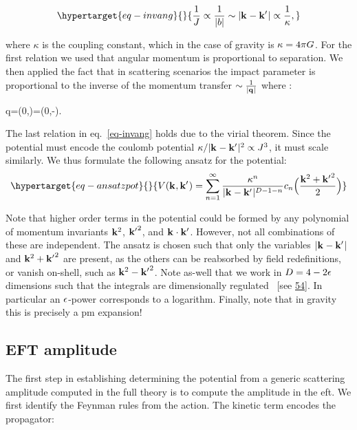 \documentclass[
  11pt,
  a4paper,
  DIV=11,
  numbers=noendperiod,
  twoside]{scrreprt}
\let\[\relax \let\]\relax %
\DeclareRobustCommand{\[}{\begin{equation}}
\DeclareRobustCommand{\]}{\end{equation}}
\begin{document}
\begin{equation}\protect\hypertarget{eq-invang}{}{
  \inv{J} \propto \inv{\abs{\impactParameter}} \sim \abs{\tv{k}-\tv{k'}}\propto \inv{\kappa},
}\label{eq-invang}\end{equation}

where \(\kappa\) is the coupling constant, which in the case of gravity
is \(\kappa=4\pi G\). For the first relation we used that angular
momentum is proportional to separation. We then applied the fact that in
scattering scenarios the impact parameter is proportional to the inverse
of the momentum transfer \(\sim\frac{1}{\vert\mathbf{{q}}_{} \vert}\) where :

\[
q=(0,)=(0,-).
\]

The last relation in eq.~\ref{eq-invang} holds due to the virial
theorem. Since the potential must encode the coulomb potential
\(\kappa/\vert\mathbf{{k}}_{}-\mathbf{{k'}}_{} \vert^2\propto J^3\), it must scale similarly.
We thus formulate the following ansatz for the potential:
\begin{equation}\protect\hypertarget{eq-ansatzpot}{}{
\pot(\tv{k},\tv{k'})=\sum_{n=1}^\infty \frac{\kappa^n}{\abs{\tv{k}-\tv{k'}}^{\Dim-1-n}} c_n\pa[\Big]{\frac{\tv{k}^2+\tv{k'}^2}{2}}
}\label{eq-ansatzpot}\end{equation}

Note that higher order terms in the potential could be formed by any
polynomial of momentum invariants \(\mathbf{{k}}_{}^2\), \(\mathbf{{k'}}_{}^2\), and
\(\mathbf{{k}}_{}\cdot\mathbf{{k'}}_{}\). However, not all combinations of these are
independent. The ansatz is chosen such that only the variables
\(\vert\mathbf{{k}}_{}-\mathbf{{k'}}_{} \vert\) and \(\mathbf{{k}}_{}^2+\mathbf{{k'}}_{}^2\) are present, as the
others can be reabsorbed by field redefinitions, or vanish on-shell,
such as \(\mathbf{{k}}_{}^2-\mathbf{{k'}}_{}^2\). Note as-well that we work in
\(D=4-2\epsilon\) dimensions such that the integrals are dimensionally
regulated ~{[}see \protect\hyperlink{ref-tHooft:1972tcz}{54}{]}. In
particular an \(\epsilon\)-power corresponds to a logarithm.
Finally, note that in gravity this is precisely a \gls{pm} expansion!

\hypertarget{eft-amplitude}{%
\subsection{EFT amplitude}\label{eft-amplitude}}

The first step in establishing determining the potential from a generic
scattering amplitude computed in the full theory is to compute the
amplitude in the \gls{eft}. We first identify the Feynman rules from the
action. The kinetic term encodes the propagator:
\end{document}
